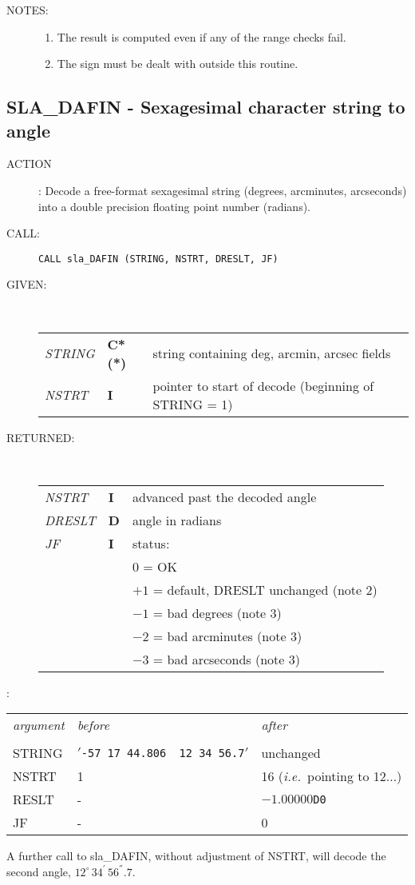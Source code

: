 \documentclass[11pt,twoside]{article}
\newcommand{\xlabel}[1]{}
\newcommand{\arcsec}[2] {\arcseci{#1}$\hspace{-0.4em}.#2$}
\newcommand{\arcsec}[2] {
      {$#1\hspace{-0.05em}^{'\hspace{-0.1em}'}\hspace{-0.4em}.#2$}
   }
\newcommand{\arcseci}[1] {$#1\hspace{-0.05em}$\raisebox{-0.5ex}
                         {$^{'\hspace{-0.1em}'}$}}
\renewcommand{\arcseci}[1] {$#1\hspace{-0.05em}^{'\hspace{-0.1em}'}$}
\newcommand{\dms}[4]    {$#1^{\circ}\,#2\raisebox{-0.5ex}
                        {$^{'}$}\,$\arcsec{#3}{#4}}
\renewcommand{\dms}[4]{$#1^{\circ}\,#2^{'}\,#3^{''}.#4$}
\newcommand{\routine}[3]
{\hbadness=10000
  \vbox
  {
    \rule{\textwidth}{0.3mm}\\
    {\Large {\bf #1} \hfill #2 \hfill {\bf #1}}\\
    \setlength{\oldspacing}{\topsep}
    \setlength{\topsep}{0.3ex}
    \begin{description}
      #3
    \end{description}
    \setlength{\topsep}{\oldspacing}
  }
}
\renewcommand{\routine}[3]
   {
      \subsection{#1\xlabel{#1} - #2\label{#1}}
       \begin{description}
         #3
       \end{description}
   }
\newcommand{\action}[1]
{\item[ACTION]: #1}
\newcommand{\action}[1]
   {\item[ACTION:] #1}
\newcommand{\call}[1]
{\item[CALL]: \hspace{0.4em}{\tt #1}}
\newlength{\oldspacing}
\renewcommand{\call}[1]
   {
    \item[CALL:] {\tt #1}
   }
\newcommand{\args}[2]
{
  \goodbreak
  \setlength{\oldspacing}{\topsep}
  \setlength{\topsep}{0.3ex}
  \begin{description}
  \item[#1]:\\[1.5ex]
    \begin{tabular}{p{7em}p{6em}p{22em}}
      #2
    \end{tabular}
  \end{description}
  \setlength{\topsep}{\oldspacing}
}
\renewcommand{\args}[2]
   {
     \begin{description}
        \item[#1:]\\
        \begin{tabular}{p{7em}p{6em}l}
           #2
        \end{tabular}
     \end{description}
   }
\newcommand{\spec}[3]
{
  {\em {#1}} & {\bf \mbox{#2}} & {#3}
}
\newcommand{\notes}[1]
{
  \goodbreak
  \setlength{\oldspacing}{\topsep}
  \setlength{\topsep}{0.3ex}
  \begin{description}
    \item[NOTES]:
        #1
  \end{description}
  \setlength{\topsep}{\oldspacing}
}
\renewcommand{\notes}[1]
   {
      \begin{description}
         \item[NOTES:]
            #1
      \end{description}
   }
\begin{document}
\notes
{
 \begin{enumerate}
  \item The result is computed even if any of the range checks fail.
  \item The sign must be dealt with outside this routine.
 \end{enumerate}
}
\routine{SLA\_DAFIN}{Sexagesimal character string to angle}
{
 \action{Decode a free-format sexagesimal string (degrees, arcminutes,
         arcseconds) into a double precision floating point
         number (radians).}
 \call{CALL sla\_DAFIN (STRING, NSTRT, DRESLT, JF)}
}
\args{GIVEN}
{
 \spec{STRING}{C*(*)}{string containing deg, arcmin, arcsec fields} \\
 \spec{NSTRT}{I}{pointer to start of decode (beginning of STRING = 1)}
}
\args{RETURNED}
{
 \spec{NSTRT}{I}{advanced past the decoded angle} \\
 \spec{DRESLT}{D}{angle in radians} \\
 \spec{JF}{I}{status:} \\
 \spec{}{}{\hspace{1.5em}   0 = OK} \\
 \spec{}{}{\hspace{0.7em} $+1$ = default, DRESLT unchanged (note 2)} \\
 \spec{}{}{\hspace{0.7em} $-1$ = bad degrees (note 3)} \\
 \spec{}{}{\hspace{0.7em} $-2$ = bad arcminutes (note 3)} \\
 \spec{}{}{\hspace{0.7em} $-3$ = bad arcseconds (note 3)} \\
}
\goodbreak
\setlength{\oldspacing}{\topsep}
\setlength{\topsep}{0.3ex}
\begin{description}
 \item [EXAMPLE]: \\ [1.5ex]
  \begin{tabular}{p{7em}p{15em}p{12em}}
   {\it argument} & {\it before} & {\it after} \\ \\
   STRING & $'$\verb*}-57 17 44.806  12 34 56.7}$'$ & unchanged \\
   NSTRT & 1 & 16 ({\it i.e.}\ pointing to 12...) \\
   RESLT & - & $-1.00000${\tt D0} \\
   JF & - & 0
  \end{tabular}
 \item A further call to sla\_DAFIN, without adjustment of NSTRT, will
       decode the second angle, \dms{12}{34}{56}{7}.
\end{description}
\end{document}

